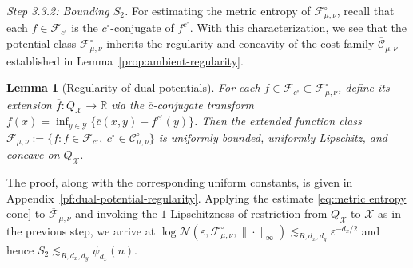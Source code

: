 \documentclass[11pt]{amsart}
\newtheorem{lemma}[theorem]{Lemma}
\theoremstyle{definition}
\theoremstyle{remark}
\newcommand{\R}{\mathbb{R}}
\newcommand{\1}{\mathbf{1}}
\numberwithin{equation}{section}
\begin{document}
\emph{Step 3.3.2: Bounding $S_2$.}
For estimating the metric entropy of $\mathcal F^\circ_{\mu,\nu}$,
recall that each $f \in \mathcal F_{c^\circ}$ is the
$c^\circ$-conjugate of $f^{c^\circ}$.
With this characterization, we see that the potential class
$\mathcal F^\circ_{\mu,\nu}$ inherits the regularity and concavity of
the cost family $\overline{\mathcal C}_{\mu,\nu}$ established in
Lemma~\ref{prop:ambient-regularity}.
\begin{lemma}[Regularity of dual potentials] \label{lem:reg of F}
For each $f\in \mathcal{F}_{c^\circ} \subset \mathcal F^\circ_{\mu,\nu}$, define its extension
$\overline{f}:Q_\mathcal{X} \to \R$ via the
$\overline{c}$-conjugate transform
$\overline{f}(x) = \inf_{y\in \mathcal{Y}}
\{\overline{c}(x, y) - f^{c^\circ}(y)\}$. Then the extended function
class $\overline{\mathcal F}_{\mu,\nu}
:= \{\overline{f}: f\in \mathcal F_{c^\circ},    \ c^\circ \in \mathcal C^\circ_{\mu,\nu}\}$ is uniformly
bounded, uniformly Lipschitz, and concave on $Q_\mathcal{X}$.
\end{lemma}
The proof, along with the corresponding uniform constants, is given in Appendix~\ref{pf:dual-potential-regularity}.
Applying the estimate \eqref{eq:metric entropy conc} to
$\overline{\mathcal F}_{\mu,\nu}$ and invoking the $1$-Lipschitzness of
restriction from $Q_\mathcal{X}$ to $\mathcal{X}$ as in the previous step,
we arrive at
$\log \mathcal N(\varepsilon, \mathcal F^\circ_{\mu,\nu},
\|\cdot\|_\infty) \lesssim_{R,d_x,d_y} \varepsilon^{-d_{x}/2}$ and hence $S_2 \lesssim_{R,d_x,d_y} \psi_{d_x}(n)$.
\end{document}
